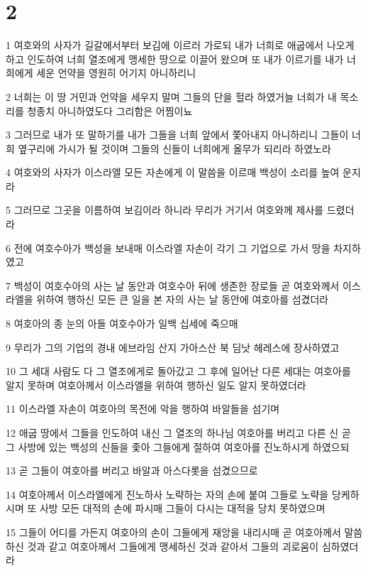 \chapter{2}

\par 1 여호와의 사자가 길갈에서부터 보김에 이르러 가로되 내가 너희로 애굽에서 나오게 하고 인도하여 너희 열조에게 맹세한 땅으로 이끌어 왔으며 또 내가 이르기를 내가 너희에게 세운 언약을 영원히 어기지 아니하리니
\par 2 너희는 이 땅 거민과 언약을 세우지 말며 그들의 단을 헐라 하였거늘 너희가 내 목소리를 청종치 아니하였도다 그리함은 어찜이뇨
\par 3 그러므로 내가 또 말하기를 내가 그들을 너희 앞에서 쫓아내지 아니하리니 그들이 너희 옆구리에 가시가 될 것이며 그들의 신들이 너희에게 올무가 되리라 하였노라
\par 4 여호와의 사자가 이스라엘 모든 자손에게 이 말씀을 이르매 백성이 소리를 높여 운지라
\par 5 그러므로 그곳을 이름하여 보김이라 하니라 무리가 거기서 여호와께 제사를 드렸더라
\par 6 전에 여호수아가 백성을 보내매 이스라엘 자손이 각기 그 기업으로 가서 땅을 차지하였고
\par 7 백성이 여호수아의 사는 날 동안과 여호수아 뒤에 생존한 장로들 곧 여호와께서 이스라엘을 위하여 행하신 모든 큰 일을 본 자의 사는 날 동안에 여호아를 섬겼더라
\par 8 여호아의 종 눈의 아들 여호수아가 일백 십세에 죽으매
\par 9 무리가 그의 기업의 경내 에브라임 산지 가아스산 북 딤낫 헤레스에 장사하였고
\par 10 그 세대 사람도 다 그 열조에게로 돌아갔고 그 후에 일어난 다른 세대는 여호아를 알지 못하며 여호아께서 이스라엘을 위하여 행하신 일도 알지 못하였더라
\par 11 이스라엘 자손이 여호아의 목전에 악을 행하여 바알들을 섬기며
\par 12 애굽 땅에서 그들을 인도하여 내신 그 열조의 하나님 여호아를 버리고 다른 신 곧 그 사방에 있는 백성의 신들을 좇아 그들에게 절하여 여호아를 진노하시게 하였으되
\par 13 곧 그들이 여호아를 버리고 바알과 아스다롯을 섬겼으므로
\par 14 여호아께서 이스라엘에게 진노하사 노략하는 자의 손에 붙여 그들로 노략을 당케하시며 또 사방 모든 대적의 손에 파시매 그들이 다시는 대적을 당치 못하였으며
\par 15 그들이 어디를 가든지 여호아의 손이 그들에게 재앙을 내리시매 곧 여호아께서 말씀하신 것과 같고 여호아께서 그들에게 맹세하신 것과 같아서 그들의 괴로움이 심하였더라

